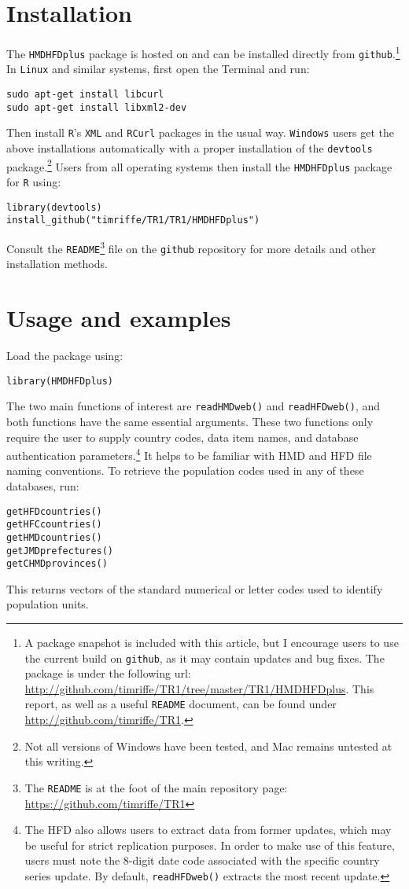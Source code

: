 \documentclass{article}
\begin{document}
\section{Installation}
The \texttt{HMDHFDplus} package is hosted on and can be installed
directly from \texttt{github}.\footnote{A package snapshot is included with
this article, but I encourage users to use the current build on
\texttt{github}, as it may contain updates and bug fixes. The package is under
the following url:
\url{http://github.com/timriffe/TR1/tree/master/TR1/HMDHFDplus}. This report,
as well as a useful \texttt{README} document, can be found under
\url{http://github.com/timriffe/TR1}.} In \texttt{Linux} and similar systems,
first open the Terminal and run:
\begin{verbatim}
sudo apt-get install libcurl
sudo apt-get install libxml2-dev
\end{verbatim}
Then install \texttt{R}'s \texttt{XML} and \texttt{RCurl} packages in the usual
way. \texttt{Windows} users get the above installations automatically with a
proper installation of the \texttt{devtools} package.\footnote{Not all versions
of Windows have been tested, and Mac remains untested at this writing.} Users
from all operating systems then install the \texttt{HMDHFDplus} package for \texttt{R} using:
\begin{verbatim}
library(devtools)
install_github("timriffe/TR1/TR1/HMDHFDplus")
\end{verbatim}
Consult the \texttt{README}\footnote{The \texttt{README} is at the
foot of the main repository
page: \url{https://github.com/timriffe/TR1}} file on the
\texttt{github} repository for more details and other installation methods. 

\section{Usage and examples}
Load the package using:
\begin{verbatim}
library(HMDHFDplus)
\end{verbatim}
The two main functions of interest are \texttt{readHMDweb()} and
\texttt{readHFDweb()}, and both functions have the same essential
arguments. These two functions only require the user to supply country codes,
data item names, and database authentication parameters.\footnote{The HFD also
allows users to extract data from former updates, which may be useful for
strict replication purposes. In order to make use of this feature, users must
note the 8-digit date code associated with the specific country series
update. By default, \texttt{readHFDweb()} extracts the most recent update.} It
helps to be familiar with HMD and HFD file naming conventions. To retrieve the population codes used in any of
these databases, run:
\begin{verbatim}
getHFDcountries()
getHFCcountries()
getHMDcountries()
getJMDprefectures()
getCHMDprovinces()
\end{verbatim}
This returns vectors of the standard numerical or letter codes used to identify
population units. 
\end{document}
